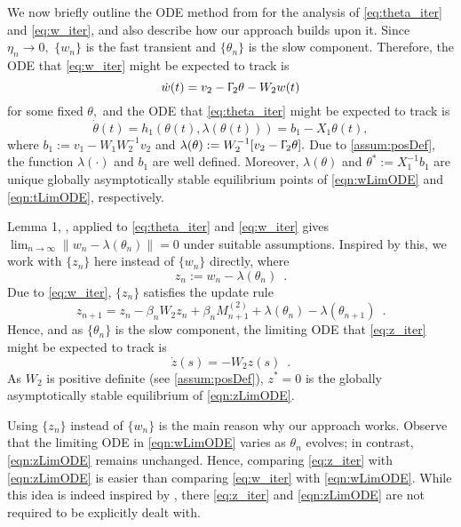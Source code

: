 \documentclass[usenames,dvipsnames,final,12pt]{colt2018} %
\newcommand{\hth}{h_1}
\newcommand{\bt}{b_1}
\newcommand{\vt}{v_1}
\newcommand{\Xt}{X_1}
\newcommand{\Wt}{W_1}
\newcommand{\thS}{\theta^*}
\newcommand{\vw}{v_2}
\newcommand{\Tw}{\Upgamma_2}
\newcommand{\Ww}{W_2}
\newcommand{\Mw}{M^{(2)}}
\newcommand{\sw}{\beta}
\newcommand{\norm}[1]{\left\lVert#1\right\rVert}
\newcommand{\zS}{z^*}
\newcommand{\gugan}[1]{#1}
\begin{document}
\gugan{We now briefly outline the ODE method from \cite[pp. 64-65]{borkar2008stochastic} for the analysis of \eqref{eq:theta_iter} and \eqref{eq:w_iter}, and also describe how our approach builds upon it. Since $\eta_n \to 0,$ $\{w_n\}$ is the fast transient and $\{\theta_n\}$ is the slow component. Therefore, the ODE that \eqref{eq:w_iter} might be expected to track is
%
\begin{equation}
\label{eqn:wLimODE}
\dot{w}(t) = \vw - \Tw \theta - \Ww w(t)
\end{equation}
%
for some fixed $\theta,$  and the ODE that \eqref{eq:theta_iter} might be expected to track is
%
\begin{equation}
\label{eqn:tLimODE}
\dot{\theta}(t) = \hth(\theta(t), \lambda(\theta(t))) = \bt - \Xt \theta(t),
\end{equation}
%
where $\bt := \vt - \Wt \Ww^{-1} \vw$ and $\lambda(\theta) := \Ww^{-1}[\vw - \Tw\theta].$
Due to \ref{assum:posDef}, the function $\lambda(\cdot)$ and $\bt$ are well defined.} Moreover, $\lambda(\theta)$ and $\thS := \Xt^{-1}\bt$ are unique globally asymptotically stable equilibrium points of \eqref{eqn:wLimODE} and \eqref{eqn:tLimODE}, respectively.

Lemma 1, \cite[p. 66]{borkar2008stochastic}, applied to \eqref{eq:theta_iter} and \eqref{eq:w_iter} gives $\lim_{n \to \infty} \norm{w_n - \lambda(\theta_n)} = 0$ under suitable assumptions. \gugan{Inspired by this,} we work with $\{z_n\}$ here instead of $\{w_n\}$ directly, where
%
{
\begin{equation}
\label{eq: z_n def}
z_n := w_n - \lambda(\theta_n) \enspace.
\end{equation}
}
%
Due to \eqref{eq:w_iter}, $\{z_n\}$ satisfies the \gugan{update} rule
%
\begin{equation}
\label{eq:z_iter}
z_{n + 1} = z_n - \sw_n \Ww z_n + \sw_n \Mw_{n + 1} + \lambda(\theta_n) - \lambda(\theta_{n + 1}) \enspace.
\end{equation}
%
\gugan{Hence, and as $\{\theta_n\}$ is the slow component, the limiting ODE that \eqref{eq:z_iter} might be expected to track is}
%
\begin{equation}
\label{eqn:zLimODE}
\dot{z}(s) = -\Ww z(s) \enspace.
\end{equation}
%
\gugan{As} $\Ww$ is positive definite (see \ref{assum:posDef}), $\zS = 0$ is the  globally asymptotically stable equilibrium of \eqref{eqn:zLimODE}.

\begin{remark}
\label{rem:AnalysisApproach}
\gugan{Using} $\{z_n\}$ instead of $\{w_n\}$ is the main reason why our approach works. \gugan{Observe that the limiting ODE in \eqref{eqn:wLimODE} varies as $\theta_n$ evolves;} \gugan{in contrast}, \eqref{eqn:zLimODE} remains unchanged. \gugan{Hence,} comparing \eqref{eq:z_iter} with \eqref{eqn:zLimODE} \gugan{is} easier than comparing \eqref{eq:w_iter} with \eqref{eqn:wLimODE}. \gugan{While this idea is indeed inspired by \cite[Lemma 1, p. 66]{borkar2008stochastic}, there \eqref{eq:z_iter} and \eqref{eqn:zLimODE} are not required to be explicitly dealt with.}
\end{remark}
\end{document}
